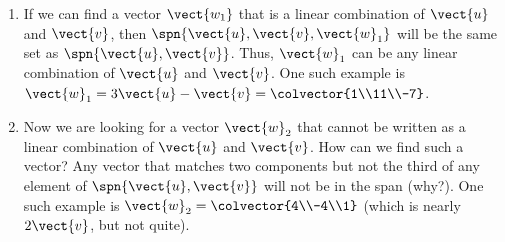 \begin{enumerate}
%
\item 
If we can find a vector $\vect{w_1}$ that is a linear combination of $\vect{u}$ and $\vect{v}$, then $\spn{\vect{u}, \vect{v}, \vect{w}_1}$ will be the same set as $\spn{\vect{u}, \vect{v}}$.  Thus, $\vect{w}_1$ can be any linear combination of $\vect{u}$ and $\vect{v}$.  One such example is 
$\vect{w}_1 = 3\vect{u} - \vect{v} = \colvector{1\\11\\-7}$.
%
\item 
Now we are looking for a vector $\vect{w}_2$ that cannot be written as a linear combination of $\vect{u}$ and $\vect{v}$. How can we find such a vector?  Any vector that matches two components but not the third of any element of $\spn{\vect{u}, \vect{v}}$ will not be in the span (why?).  One such example is 
$\vect{w}_2 = \colvector{4\\-4\\1}$ 
(which is nearly $2\vect{v}$, but not quite).
%
\end{enumerate}